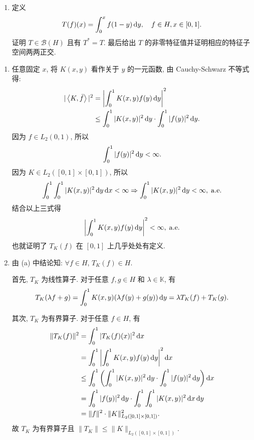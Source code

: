 \begin{enumerate}
\begin{enumerate}
      \item 定义
      \[
      T(f)(x)=\int_{0}^{x} f(1-y)\mathop{}\!\mathrm{d} y, \quad f \in H, x \in[0,1].
      \]
      证明 $T\in\mathcal{B}(H)$ 且有 $T^{*}=T$.
      最后给出 $T$ 的非零特征值并证明相应的特征子空间两两正交.
    \end{enumerate}
    \begin{answer}
      \begin{enumerate}
        \item 任意固定 $x$, 将 $K(x,y)$ 看作关于 $y$ 的一元函数, 由 Cauchy-Schwarz 不等式得:
        \begin{align*}
            |\left\langle K,\bar{f}\right\rangle|^2
            & =\left|\int_0^1K(x,y)f(y)\mathop{}\!\mathrm{d} y\right|^2 \\
            & \leq\int_0^1|K(x,y)|^2\mathop{}\!\mathrm{d} y\cdot\int_0^1|f(y)|^2\mathop{}\!\mathrm{d} y.
        \end{align*}
        因为 $f\in L_2(0,1)$, 所以
        \[\int_0^1|f(y)|^2\mathop{}\!\mathrm{d} y<\infty.\]
        因为 $K\in L_2([0,1]\times [0,1])$, 所以
        \[\int_0^1\int_0^1|K(x,y)|^2\mathop{}\!\mathrm{d} y\mathop{}\!\mathrm{d} x<\infty\Rightarrow\int_0^1|K(x,y)|^2\mathop{}\!\mathrm{d} y<\infty, \;\mathrm{a.e.}\]
        结合以上三式得
        \[\left|\int_0^1K(x,y)f(y)\mathop{}\!\mathrm{d} y\right|^2<\infty, \;\mathrm{a.e.}\]
        也就证明了 $T_K(f)$ 在 $[0,1]$ 上几乎处处有定义.
    
        \item 由 (a) 中结论知: $\forall f\in H$, $T_K(f)\in H$.
    
        首先, $T_K$ 为线性算子. 对于任意 $f,g\in H$ 和 $\lambda\in\mathbb{K}$, 有
        \[T_K(\lambda f+g)=\int_0^1K(x,y)(\lambda f(y)+g(y))\mathop{}\!\mathrm{d} y=\lambda T_K(f)+T_K(g).\] 
    
        其次, $T_K$ 为有界算子. 对于任意 $f\in H$, 有
        \begin{align*}
            \|T_K(f)\|^2
            &=\int_0^1|T_K(f)(x)|^2\diff x\\
            &=\int_0^1\left|\int_0^1K(x,y)f(y)\diff y\right|^2\diff x\\
            &\leq \int_0^1\left(\int_0^1|K(x,y)|^2\diff y\cdot\int_0^1|f(y)|^2\diff y\right)\diff x\\
            &=\int_0^1|f(y)|^2\diff y\cdot\int_0^1\int_0^1|K(x,y)|^2\diff x\diff y\\
            &=\|f\|^2\cdot\|K\|_{L_2([0,1]\times[0,1])}^2.
        \end{align*}
        故 $T_K$ 为有界算子且 $\|T_K\|\leq \|K\|_{L_2([0,1]\times [0,1])}$.
    

\end{enumerate}
\end{answer}
\end{enumerate}
